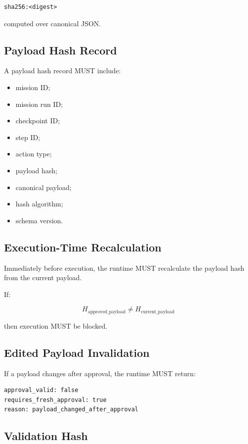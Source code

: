 \begin{verbatim}
sha256:<digest>
\end{verbatim}

computed over canonical JSON.

\subsection{Payload Hash Record}

A payload hash record MUST include:

\begin{itemize}
  \item mission ID;
  \item mission run ID;
  \item checkpoint ID;
  \item step ID;
  \item action type;
  \item payload hash;
  \item canonical payload;
  \item hash algorithm;
  \item schema version.
\end{itemize}

\subsection{Execution-Time Recalculation}

Immediately before execution, the runtime MUST recalculate the payload hash from the current payload.

If:

\begin{equation}
H_{\mathrm{approved\_payload}}
\neq
H_{\mathrm{current\_payload}}
\end{equation}

then execution MUST be blocked.

\subsection{Edited Payload Invalidation}

If a payload changes after approval, the runtime MUST return:

\begin{verbatim}
approval_valid: false
requires_fresh_approval: true
reason: payload_changed_after_approval
\end{verbatim}

\subsection{Validation Hash}

